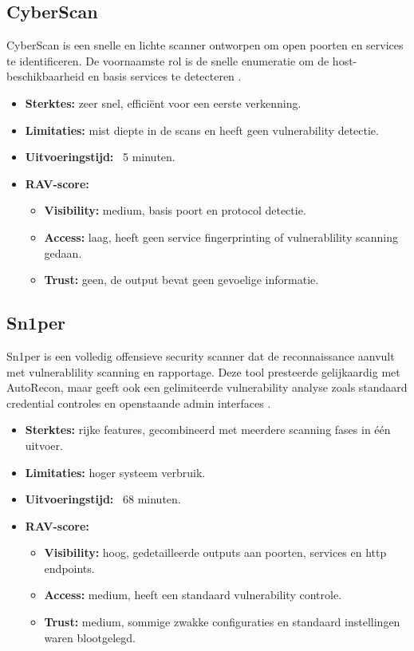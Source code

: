 \subsection{CyberScan}

CyberScan is een snelle en lichte scanner ontworpen om open poorten en services te identificeren. 
De voornaamste rol is de snelle enumeratie om de host-beschikbaarheid en basis services te detecteren \autocite{Cyberscan}.

\begin{itemize}
  \item \textbf{Sterktes:} zeer snel, efficiënt voor een eerste verkenning.
  \item \textbf{Limitaties:} mist diepte in de scans en heeft geen vulnerability detectie.
  \item \textbf{Uitvoeringstijd:} ~5 minuten.
  \item \textbf{RAV-score:}
    \small{
    \begin{itemize}
      \item \textbf{Visibility:} medium, basis poort en protocol detectie.
      \item \textbf{Access:} laag, heeft geen service fingerprinting of vulnerablility scanning gedaan.
      \item \textbf{Trust:} geen, de output bevat geen gevoelige informatie. 
    \end{itemize}
    }
\end{itemize}

\subsection{Sn1per}
Sn1per is een volledig offensieve security scanner dat de reconnaissance aanvult met vulnerablility scanning en rapportage. 
Deze tool presteerde gelijkaardig met AutoRecon, maar geeft ook een gelimiteerde vulnerability analyse zoals standaard credential controles en openstaande admin interfaces \autocite{sn1per}.

\begin{itemize}
  \item \textbf{Sterktes:} rijke features, gecombineerd met meerdere scanning fases in één uitvoer.
  \item \textbf{Limitaties:} hoger systeem verbruik.
  \item \textbf{Uitvoeringstijd:} ~68 minuten.
  \item \textbf{RAV-score:}
    \small{
    \begin{itemize}
      \item \textbf{Visibility:} hoog, gedetailleerde outputs aan poorten, services en http endpoints.
      \item \textbf{Access:} medium, heeft een standaard vulnerability controle.
      \item \textbf{Trust:} medium, sommige zwakke configuraties en standaard instellingen waren blootgelegd.
    \end{itemize}
    }
\end{itemize}


